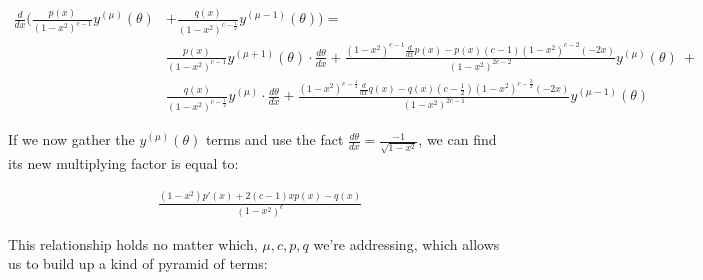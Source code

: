 \documentclass[10pt]{article}
\begin{document}
\begin{align*}
\frac{d}{dx} \Big( \frac{p(x)}{(1-x^2)^{c-1}} y^{(\mu)}(\theta) &+ \frac{q(x)}{(1-x^2)^{c -\frac{1}{2}}} y^{(\mu-1)}(\theta) \Big) = \\
&\frac{p(x)}{(1-x^2)^{c-1}} y^{(\mu+1)}(\theta) \cdot \frac{d\theta}{dx} + \frac{(1 - x^2)^{c-1} \frac{d}{dx} p(x) - p(x)(c-1)(1-x^2)^{c-2}(-2x)}{(1-x^2)^{2c - 2}} y^{(\mu)}(\theta)\ +\\
&\frac{q(x)}{(1-x^2)^{c-\frac{1}{2}}} y^{(\mu)} \cdot \frac{d\theta}{dx} + \frac{(1 - x^2)^{c-\frac{1}{2}} \frac{d}{dx} q(x) - q(x)(c-\frac{1}{2})(1-x^2)^{c-\frac{3}{2}}(-2x)}{(1-x^2)^{2c - 1}} y^{(\mu-1)}(\theta)
\end{align*} 

\noindent If we now gather the $y^{(\mu)}(\theta)$ terms and use the fact $\frac{d\theta}{dx} = \frac{-1}{\sqrt{1-x^2}}$, we can find its new multiplying factor is equal to:\vspace{-2mm}

\begin{align*}
\frac{(1-x^2)p'(x) + 2(c-1)xp(x) - q(x)}{(1 - x^2)^c}
\end{align*}

This relationship holds no matter which, $\mu, c, p, q$ we're addressing, which allows us to build up a kind of pyramid of terms:
\end{document}
